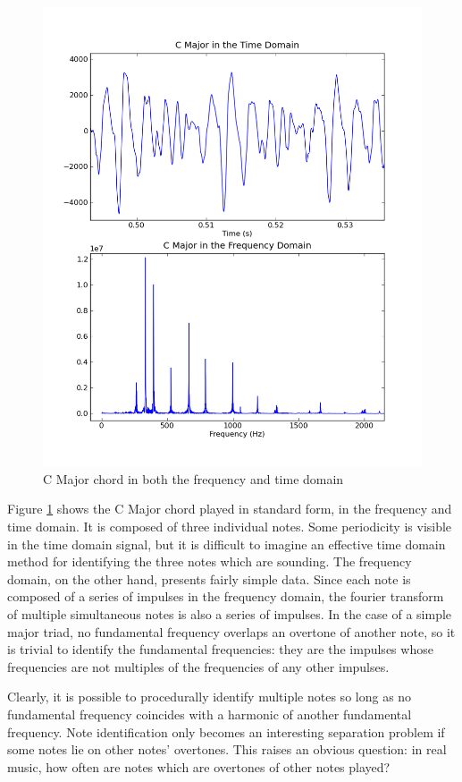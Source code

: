 \documentclass[twocolumn]{article}
\begin{document}
\begin{figure}[htb]
 \centering
 \includegraphics[scale=0.37]{cmajor.png}
 \caption{C Major chord in both the frequency and time domain}
 \label{cmajor}
\end{figure}

Figure \ref{cmajor} shows the C Major chord played in standard form, in the frequency and time domain.  It is composed of three individual notes.  Some periodicity is visible in the time domain signal, but it is difficult to imagine an effective time domain method for identifying the three notes which are sounding.  The frequency domain, on the other hand, presents fairly simple data.  Since each note is composed of a series of impulses in the frequency domain, the fourier transform of multiple simultaneous notes is also a series of impulses.  In the case of a simple major triad, no fundamental frequency overlaps an overtone of another note, so it is trivial to identify the fundamental frequencies: they are the impulses whose frequencies are not multiples of the frequencies of any other impulses.

Clearly, it is possible to procedurally identify multiple notes so long as no fundamental frequency coincides with a harmonic of another fundamental frequency.  Note identification only becomes an interesting separation problem if some notes lie on other notes' overtones.  This raises an obvious question: in real music, how often are notes which are overtones of other notes played?
\end{document}
